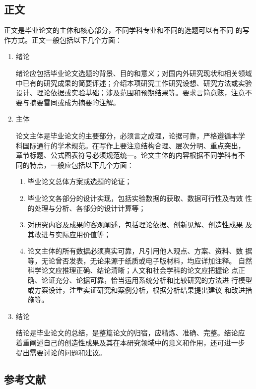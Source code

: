 \subsection{正文}

正文是毕业论文的主体和核心部分，不同学科专业和不同的选题可以有不同
的写作方式。正文一般包括以下几个方面：

\begin{enumerate}
    \item 绪论\par
          绪论应包括毕业论文选题的背景、目的和意义；对国内外研究现状和相关领域中已有的研究成果的简要评述；介绍本项研究工作研究设想、研究方法或实验设计、理论依据或实验基础；涉及范围和预期结果等。要求言简意赅，注意不要与摘要雷同或成为摘要的注解。
    \item 主体\par
          论文主体是毕业论文的主要部分，必须言之成理，论据可靠，严格遵循本学
          科国际通行的学术规范。在写作上要注意结构合理、层次分明、重点突出，
          章节标题、公式图表符号必须规范统一。论文主体的内容根据不同学科有不
          同的特点，一般应包括以下几个方面：
          \begin{enumerate}
              \item 毕业论文总体方案或选题的论证；
              \item 毕业论文各部分的设计实现，包括实验数据的获取、数据可行性及有效
                    性的处理与分析、各部分的设计计算等；
              \item 对研究内容及成果的客观阐述，包括理论依据、创新见解、创造性成果
                    及其改进与实际应用价值等；
              \item 论文主体的所有数据必须真实可靠，凡引用他人观点、方案、资料、数
                    据等，无论曾否发表，无论来源于纸质或电子版材料，均应详加注释。
                    自然科学论文应推理正确、结论清晰；人文和社会学科的论文应把握论
                    点正确、论证充分、论据可靠，恰当运用系统分析和比较研究的方法进
                    行模型或方案设计，注重实证研究和案例分析，根据分析结果提出建议
                    和改进措施等。
          \end{enumerate}
    \item 结论\par
          结论是毕业论文的总结，是整篇论文的归宿，应精炼、准确、完整。结论应
          着重阐述自己的创造性成果及其在本研究领域中的意义和作用，还可进一步
          提出需要讨论的问题和建议。
\end{enumerate}

\subsection{参考文献}

